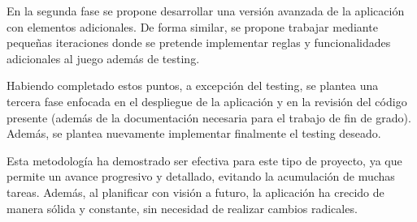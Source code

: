 En la segunda fase se propone desarrollar una versión avanzada de la aplicación con elementos adicionales. De forma similar, se propone trabajar
mediante pequeñas iteraciones donde se pretende implementar reglas y funcionalidades adicionales al juego además de testing.

Habiendo completado estos puntos, a excepción del testing, se plantea una tercera fase enfocada en el despliegue de la aplicación y en la 
revisión del código presente (además de la documentación necesaria para el trabajo de fin de grado). 
Además, se plantea  nuevamente implementar finalmente el testing deseado.

Esta metodología ha demostrado ser efectiva para este tipo de proyecto, ya que permite un avance progresivo y detallado,
evitando la acumulación de muchas tareas. Además, al planificar con visión a futuro, la aplicación ha crecido de manera sólida
y constante, sin necesidad de realizar cambios radicales.
